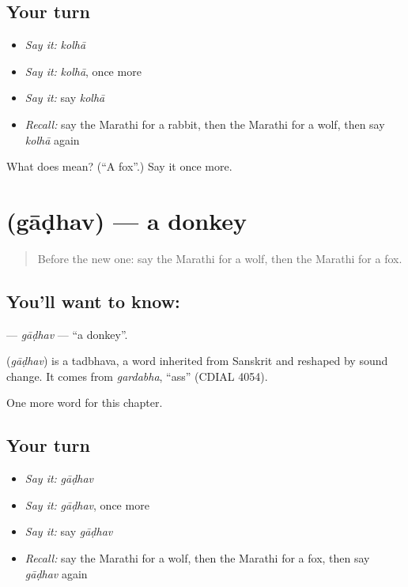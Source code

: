 \subsection*{Your turn}
\begin{itemize}
\raggedright
  \item \emph{Say it:} \emph{kolhā}
  \item \emph{Say it:} \emph{kolhā}, once more
  \item \emph{Say it:} say \emph{kolhā}
  \item \emph{Recall:} say the Marathi for a rabbit, then the Marathi for a wolf, then say \emph{kolhā} again
\end{itemize}

\begin{tcolorbox}[breakable,colback=teal!4,colframe=teal!35!black,title={Before you move on}]
What does  mean? (\textquotedblleft{}A fox\textquotedblright{}.) Say it once more.
\end{tcolorbox}
\section[\texorpdfstring{\mr{गाढव} (gāḍhav)}{गाढव (gāḍhav)}]{ (gāḍhav) — a donkey}

\label{lesson:MR-C144-gadhav}



\begin{quote}
Before the new one: say the Marathi for a wolf, then the Marathi for a fox.
\end{quote}

\subsection*{You'll want to know: }
\textbf{} — \emph{gāḍhav} — \textquotedblleft{}a donkey\textquotedblright{}.

\begin{cousinweb}
\textbf{} (\emph{gāḍhav}) is a tadbhava, a word inherited from Sanskrit and reshaped by sound change. It comes from \emph{gardabha}, \textquotedblleft{}ass\textquotedblright{} (CDIAL 4054).
\end{cousinweb}

\begin{grammarlens}[title={What you've built}]
One more word for this chapter.
\end{grammarlens}

\subsection*{Your turn}
\begin{itemize}
\raggedright
  \item \emph{Say it:} \emph{gāḍhav}
  \item \emph{Say it:} \emph{gāḍhav}, once more
  \item \emph{Say it:} say \emph{gāḍhav}
  \item \emph{Recall:} say the Marathi for a wolf, then the Marathi for a fox, then say \emph{gāḍhav} again
\end{itemize}

